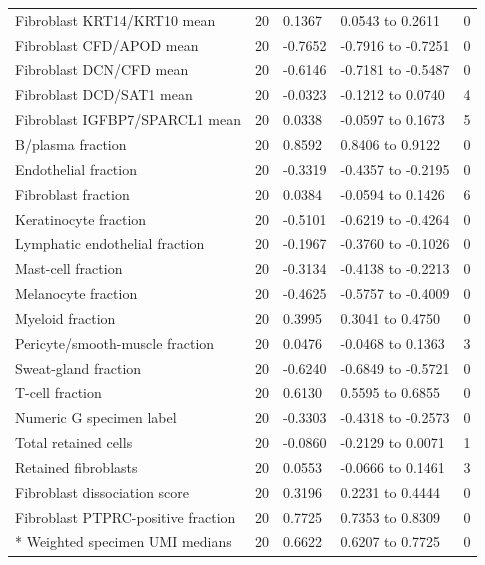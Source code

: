 {\begin{longtable}{@{}p{67mm}p{18mm}p{23mm}p{37mm}p{20mm}@{}}
Fibroblast KRT14/KRT10 mean & 20 & 0.1367 & 0.0543 to 0.2611 & 0 \\
Fibroblast CFD/APOD mean & 20 & -0.7652 & -0.7916 to -0.7251 & 0 \\
Fibroblast DCN/CFD mean & 20 & -0.6146 & -0.7181 to -0.5487 & 0 \\
Fibroblast DCD/SAT1 mean & 20 & -0.0323 & -0.1212 to 0.0740 & 4 \\
Fibroblast IGFBP7/SPARCL1 mean & 20 & 0.0338 & -0.0597 to 0.1673 & 5 \\
B/plasma fraction & 20 & 0.8592 & 0.8406 to 0.9122 & 0 \\
Endothelial fraction & 20 & -0.3319 & -0.4357 to -0.2195 & 0 \\
Fibroblast fraction & 20 & 0.0384 & -0.0594 to 0.1426 & 6 \\
Keratinocyte fraction & 20 & -0.5101 & -0.6219 to -0.4264 & 0 \\
Lymphatic endothelial fraction & 20 & -0.1967 & -0.3760 to -0.1026 & 0 \\
Mast-cell fraction & 20 & -0.3134 & -0.4138 to -0.2213 & 0 \\
Melanocyte fraction & 20 & -0.4625 & -0.5757 to -0.4009 & 0 \\
Myeloid fraction & 20 & 0.3995 & 0.3041 to 0.4750 & 0 \\
Pericyte/smooth-muscle fraction & 20 & 0.0476 & -0.0468 to 0.1363 & 3 \\
Sweat-gland fraction & 20 & -0.6240 & -0.6849 to -0.5721 & 0 \\
T-cell fraction & 20 & 0.6130 & 0.5595 to 0.6855 & 0 \\
Numeric G specimen label & 20 & -0.3303 & -0.4318 to -0.2573 & 0 \\
Total retained cells & 20 & -0.0860 & -0.2129 to 0.0071 & 1 \\
Retained fibroblasts & 20 & 0.0553 & -0.0666 to 0.1461 & 3 \\
Fibroblast dissociation score & 20 & 0.3196 & 0.2231 to 0.4444 & 0 \\
Fibroblast PTPRC-positive fraction & 20 & 0.7725 & 0.7353 to 0.8309 & 0 \\*
Weighted specimen UMI medians & 20 & 0.6622 & 0.6207 to 0.7725 & 0 \\
\end{longtable}
}

